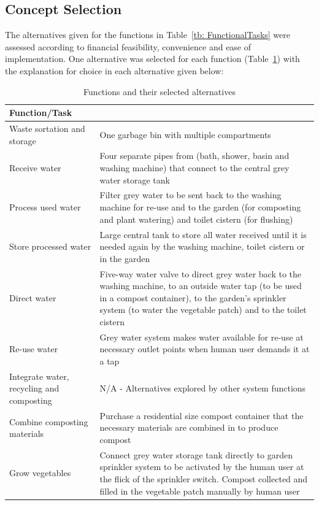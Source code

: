 \documentclass[a4paper,11pt,fleqn]{report}
\begin{document}
\subsection{Concept Selection}
The alternatives given for the functions in Table~\ref{tb: FunctionalTasks} were assessed according to financial feasibility, convenience and ease of implementation. One alternative was selected for each function (Table~\ref{tb: chosen_Alts}) with the explanation for choice in each alternative given below:\\

\begin{table}[h!]
\caption {Functions and their selected alternatives} \label{tb: chosen_Alts} 
\begin{center}
\begin{tabular}{p{3.5cm}|p{9cm}}\toprule
	{\textbf{Function/Task}} & {\textbf{Selected Alternative}\\ \midrule
    Waste sortation and storage & One garbage bin with multiple compartments \\
     \hline
     Receive water & Four separate pipes from (bath, shower, basin and washing machine) that connect to the central grey water storage tank\\
    \hline
    Process used water & Filter grey water to be sent back to the washing machine for re-use and to the garden (for composting and plant watering) and toilet cistern (for flushing)\\
    \hline
    Store processed water & Large central tank to store all water received until it is needed again by the washing machine, toilet cistern or in the garden\\
    \hline
    Direct water & Five-way water valve to direct grey water back to the washing machine, to an outside water tap (to be used in a compost container), to the garden's sprinkler system (to water the vegetable patch) and to the toilet cistern\\
    \hline
    Re-use water & Grey water system makes water available for re-use at necessary outlet points when human user demands it at a tap\\
    \hline
    Integrate water, recycling and composting & N/A - Alternatives explored by other system functions\\
    \hline
     Combine composting materials & Purchase a residential size compost container that the necessary materials are combined in to produce compost\\
    \hline
Grow vegetables & Connect grey water storage tank directly to garden sprinkler system to be activated by the human user at the flick of the sprinkler switch. Compost collected and filled in the vegetable patch manually by human user\\
    \hline
    \bottomrule
\end{tabular}
\end{center}
\end{table}
%
\end{document}

